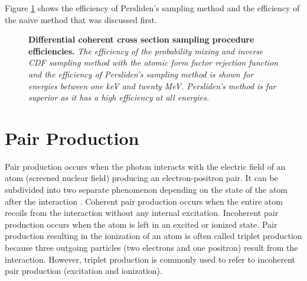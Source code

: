 Figure \ref{fig:diff_coh_sampling_proc_eff} shows the efficiency of Persliden's 
sampling method and the efficiency of the naive method that was discussed first.
\begin{figure}[t!]
  \begin{center}
  \end{center}
  \caption{\textbf{Differential coherent cross section sampling procedure efficiencies.}
    \textit{The efficiency of the probability mixing and inverse CDF sampling 
      method with the atomic form factor rejection function and the efficiency 
      of Persliden's sampling method is shown for energies between one keV and 
      twenty MeV. Persliden's method is far superior as it has a high 
      efficiency at all energies.}}
  \label{fig:diff_coh_sampling_proc_eff}
\end{figure}

\section{Pair Production}
\label{sec:pair_production}
Pair production occurs when the photon interacts with the electric field of an
atom (screened nuclear field) producing an electron-positron pair. It can be
subdivided into two separate phenomenon depending on the state of the atom
after the interaction \citep{hubbell_pair_1980}. Coherent pair production occurs
when the entire atom recoils from the interaction without any internal 
excitation. Incoherent pair production occurs when the atom is left in an 
excited or ionized state. Pair production resulting in the ionization of an 
atom is often called triplet production because three outgoing particles (two 
electrons and one positron) result from the interaction. However, triplet 
production is commonly used to refer to incoherent pair production 
(excitation and ionization). 

